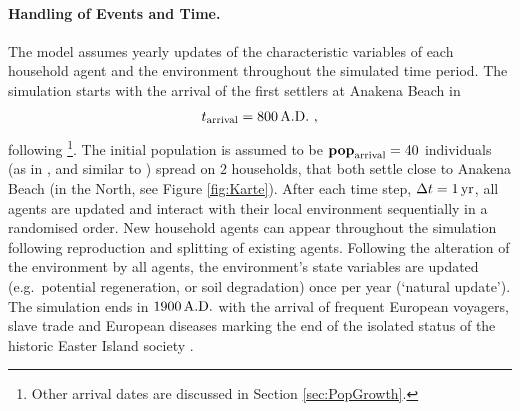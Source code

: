 \paragraph{Handling of Events and Time.}
The model assumes yearly updates of the characteristic variables of each household agent and the environment throughout the simulated time period.
The simulation starts with the arrival of the first settlers at Anakena Beach in
\begin{equation}
t_\text{arrival} = 800\, {\rm A.D.}\ ,
\end{equation}
following \citet{Bahn2017}\footnote{Other arrival dates are discussed in Section \ref{sec:PopGrowth}.}.
The initial population is assumed to be $\mathbf{pop}_{\rm arrival} = 40$ individuals (as in , and similar to ) spread on $2$ households, that both settle close to Anakena Beach (in the North, see Figure \ref{fig:Karte}).
After each time step, $\Delta t=1\,{\rm yr}$, all agents are updated and interact with their local environment sequentially in a randomised order. 
New household agents can appear throughout the simulation following reproduction and splitting of existing agents. 
Following the alteration of the environment by all agents, the environment's state variables are updated (e.g.\ potential regeneration, or soil degradation) once per year (`natural update').
The simulation ends in $1900\, {\rm A.D.}$ with the arrival of frequent European voyagers, slave trade and European diseases marking the end of the isolated status of the historic Easter Island society .%
